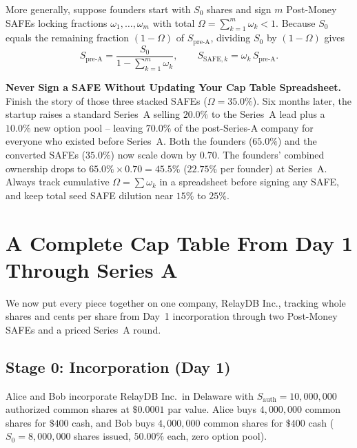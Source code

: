 More generally, suppose founders start with $S_0$ shares and sign $m$ Post-Money SAFEs locking fractions $\omega_1, \dots, \omega_m$ with total $\Omega = \sum_{k=1}^m \omega_k < 1$. Because $S_0$ equals the remaining fraction $(1 - \Omega)$ of $S_{\text{pre-A}}$, dividing $S_0$ by $(1 - \Omega)$ gives
\begin{equation}\label{eq:stacked-post-money-safes}
  S_{\text{pre-A}} = \frac{S_0}{1 - \sum_{k=1}^m \omega_k},
  \qquad
  S_{\text{SAFE},k} = \omega_k\,S_{\text{pre-A}}.
\end{equation}

\begin{trapbox}
\textbf{Never Sign a SAFE Without Updating Your Cap Table Spreadsheet.}
Finish the story of those three stacked SAFEs ($\Omega = 35.0\%$). Six months later, the startup raises a standard Series~A selling $20.0\%$ to the Series~A lead plus a $10.0\%$ new option pool -- leaving $70.0\%$ of the post-Series-A company for everyone who existed before Series~A. Both the founders ($65.0\%$) and the converted SAFEs ($35.0\%$) now scale down by $0.70$. The founders' combined ownership drops to $65.0\% \times 0.70 = 45.5\%$ ($22.75\%$ per founder) at Series~A. Always track cumulative $\Omega = \sum \omega_k$ in a spreadsheet before signing any SAFE, and keep total seed SAFE dilution near $15\%$ to $25\%$.
\end{trapbox}

\section{A Complete Cap Table From Day 1 Through Series A}
\label{sec:worked-cap-table-evolution}

We now put every piece together on one company, RelayDB Inc., tracking whole shares and cents per share from Day~1 incorporation through two Post-Money SAFEs and a priced Series~A round.

\subsection{Stage 0: Incorporation (Day 1)}

Alice and Bob incorporate RelayDB Inc.\ in Delaware with $S_{\text{auth}} = 10{,}000{,}000$ authorized common shares at $\$0.0001$ par value. Alice buys $4{,}000{,}000$ common shares for $\$400$ cash, and Bob buys $4{,}000{,}000$ common shares for $\$400$ cash ($S_0 = 8{,}000{,}000$ shares issued, $50.00\%$ each, zero option pool).

